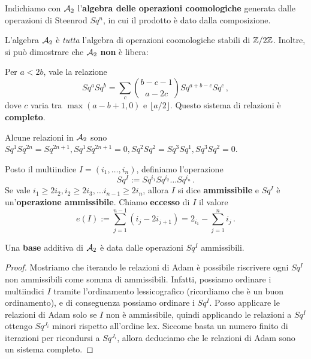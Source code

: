\begin{df}
	Indichiamo con $\mathcal{A}_{2}$ l'\textbf{algebra delle operazioni coomologiche}
	generata dalle operazioni di Steenrod $Sq^{n}$,
	in cui il prodotto è dato dalla composizione.
\end{df}

L'algebra $\mathcal{A}_{2}$ è \emph{tutta} l'algebra di operazioni coomologiche
stabili di ${\mathbb Z}/2{\mathbb Z}$. Inoltre, si può dimostrare che $\mathcal{A}_{2}$ \textbf{non} è libera:
\begin{thm}[Adams]
	Per $a < 2b$, vale la relazione
	\begin{equation*}
		Sq^{a} Sq^{b} = \sum_{c} \binom{b-c-1}{a-2c} Sq^{a+b-c} Sq^{c}\,,
	\end{equation*}
	dove $c$ varia tra $\max (a-b+1, 0)$ e $\lfloor a/2 \rfloor$.
	Questo sistema di relazioni è \textbf{completo}.
\end{thm}

\begin{ex}
	Alcune relazioni in $\mathcal{A}_{2}$ sono
	$Sq^{1} Sq^{2n} = Sq^{2n+1}, Sq^{1} Sq^{2n+1}=0, Sq^{2} Sq^{2} = Sq^{3} Sq^{1}, 
	Sq^{3} Sq^{2}= 0$.
\end{ex}

\begin{df}
	Posto il multiindice $I=(i_{1}, \dots, i_{n})$, definiamo l'operazione
	\begin{equation*}
		Sq^{I} := Sq^{i_{1}} Sq^{i_{2}} \dots Sq^{i_{n}}\,.
	\end{equation*}
	Se vale $i_{1} \ge 2 i_{2}, i_{2} \ge 2 i_{3}, \dots i_{n-1} \ge 2 i_{n}$,
	allora $I$ si dice \textbf{ammissibile}
	e $Sq^{I}$ è un'\textbf{operazione ammissibile}.
	Chiamo \textbf{eccesso} di $I$ il valore
	\begin{equation*}
		e(I) := \sum_{j=1}^{n-1} (i_{j} - 2 i_{j+1})
		= 2_{i_{1}} - \sum_{j=1}^{n} i_{j}\,.
	\end{equation*}
\end{df}

\begin{prop}
	Una \textbf{base} additiva di $\mathcal{A}_{2}$ è data dalle operazioni $Sq^{I}$ ammissibili.
	\begin{proof}
		Mostriamo che iterando le relazioni di Adam è possibile riscrivere ogni $Sq^{I}$
		non ammissibili come somma di ammissibili. Infatti,
		possiamo ordinare i multiindici $I$ tramite l'ordinamento lessicografico (ricordiamo
		che è un buon ordinamento), e di conseguenza possiamo ordinare i $Sq^{I}$.
		Posso applicare le relazioni di Adam solo se $I$ non è ammissibile,
		quindi applicando le relazioni a $Sq^{I}$ ottengo $Sq^{J_{i}}$
		minori rispetto all'ordine lex. Siccome basta un numero finito
		di iterazioni per ricondursi a $Sq^{J_{i}}$, allora deduciamo
		che le relazioni di Adam sono un sistema completo.
	\end{proof}
\end{prop}

